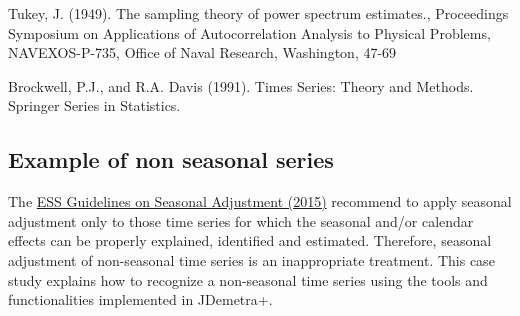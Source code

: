 \documentclass[
  letterpaper,
  DIV=11,
  numbers=noendperiod]{scrreprt}
\begin{document}
Tukey, J. (1949). The sampling theory of power spectrum estimates.,
Proceedings Symposium on Applications of Autocorrelation Analysis to
Physical Problems, NAVEXOS-P-735, Office of Naval Research, Washington,
47-69

Brockwell, P.J., and R.A. Davis (1991). Times Series: Theory and
Methods. Springer Series in Statistics.

\hypertarget{example-of-non-seasonal-series}{%
\subsection{Example of non seasonal
series}\label{example-of-non-seasonal-series}}

The
\href{https://ec.europa.eu/eurostat/documents/3859598/6830795/KS-GQ-15-001-EN-N.pdf/d8f1e5f5-251b-4a69-93e3-079031b74bd3}{ESS
Guidelines on Seasonal Adjustment (2015)} recommend to apply seasonal
adjustment only to those time series for which the seasonal and/or
calendar effects can be properly explained, identified and estimated.
Therefore, seasonal adjustment of non-seasonal time series is an
inappropriate treatment. This case study explains how to recognize a
non-seasonal time series using the tools and functionalities implemented
in JDemetra+.
\end{document}
